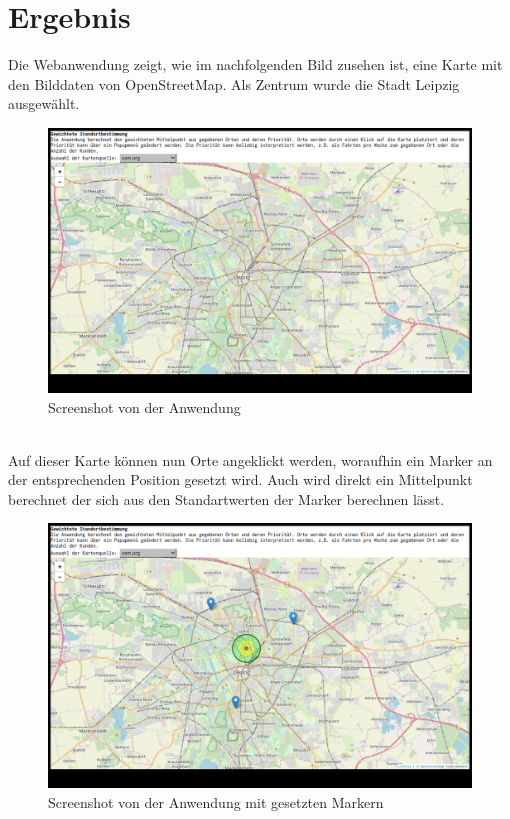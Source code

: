 \documentclass[a4paper, 12pt]{scrreprt}
\begin{document}
\chapter{Ergebnis}
Die Webanwendung zeigt, wie im nachfolgenden Bild zusehen ist, eine Karte mit den Bilddaten von OpenStreetMap. Als Zentrum wurde die Stadt Leipzig ausgewählt.\\
\begin{figure}[h]
\includegraphics[width=\linewidth]{bell1_1.png}
\caption{Screenshot von der Anwendung}
\end{figure}\\
Auf dieser Karte können nun Orte angeklickt werden, woraufhin ein Marker an der entsprechenden Position gesetzt wird. Auch wird direkt ein Mittelpunkt berechnet der sich aus den Standartwerten der Marker berechnen lässt.\\
\begin{figure}[h]
\includegraphics[width=\linewidth]{bell2_1.png}
\caption{Screenshot von der Anwendung mit gesetzten Markern}
\end{figure}
\end{document}
